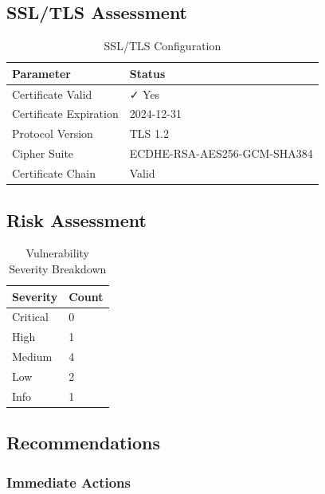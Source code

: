 \documentclass[12pt,a4paper]{report}
\begin{document}
\subsection{SSL/TLS Assessment}

\begin{table}[H]
    \centering
    \caption{SSL/TLS Configuration}
    \label{tab:ssl_config}
    \begin{tabular}{@{}ll@{}}
        \toprule
        Parameter & Status \\
        \midrule
        Certificate Valid & ✓ Yes \\
        Certificate Expiration & 2024-12-31 \\
        Protocol Version & TLS 1.2 \\
        Cipher Suite & ECDHE-RSA-AES256-GCM-SHA384 \\
        Certificate Chain & Valid \\
        \bottomrule
    \end{tabular}
\end{table}

\subsection{Risk Assessment}

\begin{table}[H]
    \centering
    \caption{Vulnerability Severity Breakdown}
    \label{tab:severity_breakdown}
    \begin{tabular}{@{}ll@{}}
        \toprule
        Severity & Count \\
        \midrule
        Critical & 0 \\
        High & 1 \\
        Medium & 4 \\
        Low & 2 \\
        Info & 1 \\
        \bottomrule
    \end{tabular}
\end{table}

\subsection{Recommendations}

\subsubsection{Immediate Actions}
\end{document}
